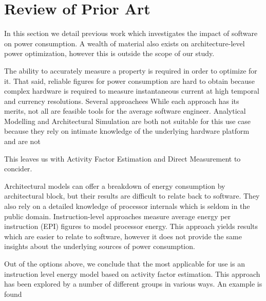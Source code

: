 \section{Review of Prior Art}
\label{sec:prior}

In this section we detail previous work which investigates the impact of software on power consumption. A wealth of material also exists on architecture-level power optimization, however this is outside the scope of our study.\golden

The ability to accurately measure a property is required in order to optimize for it. That said, reliable figures for power consumption are hard to obtain because complex hardware is required to measure instantaneous current at high temporal and currency resolutions. Several approachees  While each approach has its merits, not all are feasible tools for the average software engineer. Analytical Modelling and Architectural Simulation are both not suitable for this use case because they rely on intimate knowledge of the underlying hardware platform and are not 







This leaves us with Activity Factor Estimation and  Direct Measurement to concider.






Architectural models can offer a breakdown of energy consumption by architectural block, but their results are difficult to relate back to software. They also rely on a detailed knowledge of processor internals which is seldom in the public domain. Instruction-level approaches measure average energy per instruction (EPI) figures to model processor energy. This approach yields results which are easier to relate to software, however it does not provide the same insights about the underlying sources of power consumption.\golden


Out of the options above, we conclude that the most applicable for use is an instruction level energy model based on activity factor estimation. This approach has been explored by a number of different groups in various ways. An  example is found  








